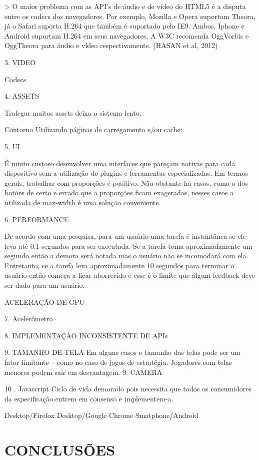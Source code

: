 \documentclass[11pt,a4paper]{article}
\begin{document}
> O maior problema com as API's de áudio e de vídeo do HTML5 é a disputa entre os codecs dos navegadores. Por exemplo, Mozilla e Opera suportam Theora, já o Safari suporta H.264 que também é suportado pelo IE9. Ambos, Iphone e Android suportam H.264 em seus navegadores. A W3C recomenda OggVorbis e OggTheora para áudio e vídeo respectivamente. (HASAN et al, 2012)

3. VIDEO

Codecs

4. ASSETS

Trafegar muitos assets deixa o sistema lento.

 Contorno
Utilizando páginas de carregamento e/ou cache;

5. UI

É muito custoso desenvolver uma interfaces que pareçam nativas para cada dispositivo sem a utilização de plugins e ferramentas especializadas.
Em termos gerais, trabalhar com proporções é positivo. Não obstante há casos, como o dos botões de certo e errado que a proporções ficam exageradas, nesses casos a utilizada de max-width é uma solução conveniente.

6. PERFORMANCE

De acordo com uma pesquisa, para um usuário uma tarefa é instantânea se ele leva até 0.1 segundos para ser executada. Se a tarefa toma aproximadamente um segundo então a demora será notada mas o usuário não se incomodará com ela. Entretanto, se a tarefa leva aproximadamente 10 segundos para terminar o usuário então começa a ficar aborrecido e esse é o limite que algum feedback deve ser dado para um usuário.

ACELERAÇÂO DE GPU

7. Acelerômetro

8. IMPLEMENTAÇÃO INCONSISTENTE DE APIs

9.  TAMANHO DE TELA
Em alguns casos o tamanho das telas pode ser um fator limitante – como no caso de jogos de estratégia. Jogadores com telas menores podem sair em desvantagem.
9.  CAMERA

10 . Javascript
Ciclo de vida demorado pois necessita que todos os consumidores da especificação entrem em consenso e implementem-a.

Desktop/Firefox
Desktop/Google Chrome
Smatphone/Android

\chapter{CONCLUSÕES}
\end{document}
